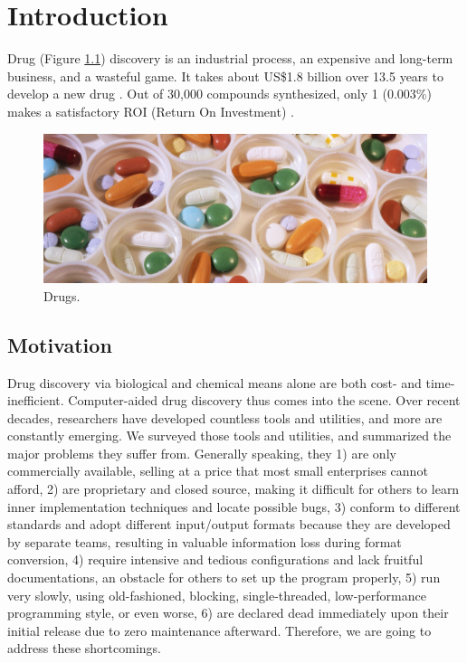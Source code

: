 \chapter{Introduction}

Drug (Figure \ref{Background:Drugs}) discovery is an industrial process, an expensive and long-term business, and a wasteful game. It takes about US\$1.8 billion over 13.5 years to develop a new drug \citep{716}. Out of 30,000 compounds synthesized, only 1 (0.003\%) makes a satisfactory ROI (Return On Investment) \citep{713}.

\begin{figure}
\centering
\includegraphics[width=\textwidth]{Background/Drugs.jpg}
\caption{Drugs.}
\label{Background:Drugs}
\end{figure}

\section{Motivation}

Drug discovery via biological and chemical means alone are both cost- and time-inefficient. Computer-aided drug discovery thus comes into the scene. Over recent decades, researchers have developed countless tools and utilities, and more are constantly emerging. We surveyed those tools and utilities, and summarized the major problems they suffer from. Generally speaking, they 1) are only commercially available, selling at a price that most small enterprises cannot afford, 2) are proprietary and closed source, making it difficult for others to learn inner implementation techniques and locate possible bugs, 3) conform to different standards and adopt different input/output formats because they are developed by separate teams, resulting in valuable information loss during format conversion, 4) require intensive and tedious configurations and lack fruitful documentations, an obstacle for others to set up the program properly, 5) run very slowly, using old-fashioned, blocking, single-threaded, low-performance programming style, or even worse, 6) are declared dead immediately upon their initial release due to zero maintenance afterward. Therefore, we are going to address these shortcomings.

